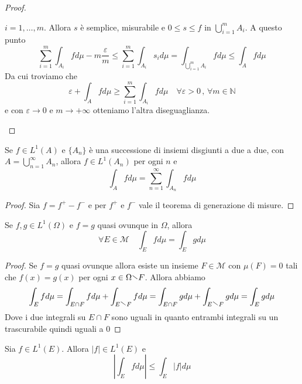 \begin{proof}
\begin{enumerate}[label = \arabic*.]
            \(i = 1, \dots, m\). Allora \(s\) è semplice, misurabile e \(0 \le s
            \le f\) in \(\bigcup_{i=1}^{m} A_{i} \). A questo punto
            \[
                \sum_{i=1}^{m} \int_{A_{i}} f d\mu  - m \frac{\varepsilon}{m}
                \le   \sum_{i=1}^m \int_{A_{i}} s_{i} d\mu =
                \int_{\bigcup_{i=1}^{m} A_{i} } f d\mu \le \int_{A} f d\mu
            \]
            Da cui troviamo che 
            \[
                \varepsilon + \int_{A} f d\mu \ge \sum_{i=1}^{m} \int_{A_{i}} f
                d\mu \quad \forall \varepsilon >0 \,,\, \forall m \in \mathbb{N}
            \]
            e con \(\varepsilon \to 0 \) e \(m \to +\infty\) otteniamo l'altra
            diseguaglianza.
    \end{enumerate}
\end{proof}
\begin{corollary}
    Se \(f \in L^{1}(A)\) e \(\{A_{n}\}\) è una successione di insiemi
    disgiunti a due a due, con \(A = \bigcup_{n=1}^{\infty} A_{n} \), allora \(f
    \in L^{1}(A_n)\) per ogni \(n\) e
    \[
        \int_{A} f d\mu = \sum_{n=1}^{\infty}
        \int_{A_{n}} f d\mu
    \]
\end{corollary}
\begin{proof}
    Sia \(f = f^{+} - f^{-}\) e per \(f^{+}\) e \(f^{-}\) vale il teorema di
    generazione di misure.
\end{proof}
\begin{corollary}
    Se \(f, g \in L^{1} (\Omega)\) e \(f = g\) quasi ovunque in \(\Omega\),
    allora \[\forall E \in \mathcal{M} \quad \int_{E} f d\mu = \int_{E} g d\mu\]
\end{corollary}
\begin{proof}
    Se \(f=g\) quasi ovunque allora esiste un insieme \(F \in \mathcal{M}\) con
    \(\mu(F) = 0\) tali che \(f(x) = g(x)\) per ogni \(x \in \Omega \sminus F\).
    Allora abbiamo
    \[
        \int_{E} f d\mu = \int_{E \cap F} f d\mu + \int_{E \sminus F} f d\mu =
        \int_{E \cap F} g d\mu + \int_{E \sminus F} g d\mu = \int_{E} g d\mu
    \]
    Dove i due integrali su \(E \cap F\) sono uguali in quanto entrambi
    integrali su un trascurabile quindi uguali a 0
\end{proof}
\begin{proposition}\label{help:cau_sch_int}
    Sia \(f \in L^{1}(E)\). Allora \(|f| \in L^{1}(E)\) e
    \[
        \left| \int_{E} f d\mu \right| \le \int_{E} |f| d\mu
    \]
\end{proposition}
